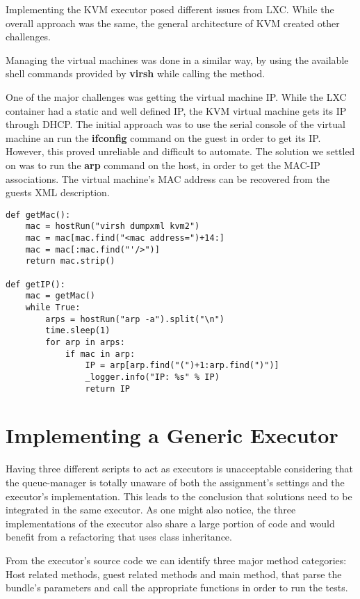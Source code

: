 Implementing the KVM executor posed different issues from LXC. While the
overall approach was the same, the general architecture of KVM created other
challenges. 

Managing the virtual machines was done in a similar way, by using the available
shell commands provided by \textbf{virsh} while calling the  method.

One of the major challenges was getting the virtual machine IP. While the
LXC container had a static and well defined IP, the KVM virtual machine gets
its IP through DHCP. The initial approach was to use the serial console of 
the virtual machine an run the \textbf{ifconfig} command on the guest in order
to get its IP. However, this proved unreliable and difficult to automate. The
solution we settled on was to run the \textbf{arp} command on the host, in order
to get the MAC-IP associations. The virtual machine's MAC address can be
recovered from the guests XML description.

\lstset{caption=Getting the KVM Guest's IP, label=lst:kvm-ip}
\begin{lstlisting}
def getMac():
    mac = hostRun("virsh dumpxml kvm2")
    mac = mac[mac.find("<mac address=")+14:]
    mac = mac[:mac.find("'/>")]
    return mac.strip()
    
def getIP():
    mac = getMac()
    while True:
        arps = hostRun("arp -a").split("\n")
        time.sleep(1)
        for arp in arps:
            if mac in arp:
                IP = arp[arp.find("(")+1:arp.find(")")]
                _logger.info("IP: %s" % IP)
                return IP
\end{lstlisting}
       

\section{Implementing a Generic Executor}
\label{sec:vmc-generic}


Having three different scripts to act as executors is unacceptable considering
that the queue-manager is totally unaware of both the assignment's settings
and the executor's implementation. This leads to the conclusion that solutions
need to be integrated in the same executor. As one might also notice, the
three implementations of the executor also share a large portion of code and
would benefit from a refactoring that uses class inheritance.

From the executor's source code we can identify three major method categories:
Host related methods, guest related methods and main method, that parse the
bundle's parameters and call the appropriate functions in order to run the tests.


